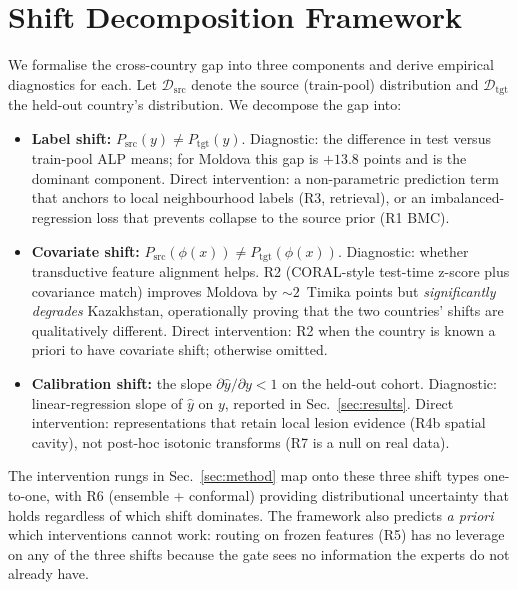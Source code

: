 \documentclass[runningheads]{llncs}
\begin{document}
\section{Shift Decomposition Framework}
\label{sec:framework}

We formalise the cross-country gap into three components and derive empirical diagnostics for each. Let $\mathcal{D}_{\text{src}}$ denote the source (train-pool) distribution and $\mathcal{D}_{\text{tgt}}$ the held-out country's distribution. We decompose the gap into:
\begin{itemize}
\item \textbf{Label shift:} $P_{\text{src}}(y) \neq P_{\text{tgt}}(y)$. Diagnostic: the difference in test versus train-pool ALP means; for Moldova this gap is $+13.8$ points and is the dominant component. Direct intervention: a non-parametric prediction term that anchors to local neighbourhood labels (R3, retrieval), or an imbalanced-regression loss that prevents collapse to the source prior (R1 BMC).
\item \textbf{Covariate shift:} $P_{\text{src}}(\phi(x)) \neq P_{\text{tgt}}(\phi(x))$. Diagnostic: whether transductive feature alignment helps. R2 (CORAL-style test-time z-score plus covariance match) improves Moldova by $\sim 2$~Timika points but \emph{significantly degrades} Kazakhstan, operationally proving that the two countries' shifts are qualitatively different. Direct intervention: R2 when the country is known a priori to have covariate shift; otherwise omitted.
\item \textbf{Calibration shift:} the slope $\partial \hat{y}/\partial y < 1$ on the held-out cohort. Diagnostic: linear-regression slope of $\hat{y}$ on $y$, reported in Sec.~\ref{sec:results}. Direct intervention: representations that retain local lesion evidence (R4b spatial cavity), not post-hoc isotonic transforms (R7 is a null on real data).
\end{itemize}
The intervention rungs in Sec.~\ref{sec:method} map onto these three shift types one-to-one, with R6 (ensemble + conformal) providing distributional uncertainty that holds regardless of which shift dominates. The framework also predicts \emph{a priori} which interventions cannot work: routing on frozen features (R5) has no leverage on any of the three shifts because the gate sees no information the experts do not already have.
\end{document}
